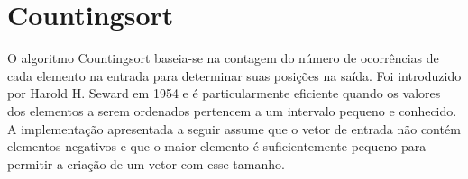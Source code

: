\section{Countingsort}
O algoritmo Countingsort baseia-se na contagem do número de ocorrências de cada elemento na entrada para determinar suas posições na saída. Foi introduzido por Harold H. Seward em 1954 e é particularmente eficiente quando os valores dos elementos a serem ordenados pertencem a um intervalo pequeno e conhecido. A implementação apresentada a seguir assume que o vetor de entrada não contém elementos negativos e que o maior elemento é suficientemente pequeno para permitir a criação de um vetor com esse tamanho.

